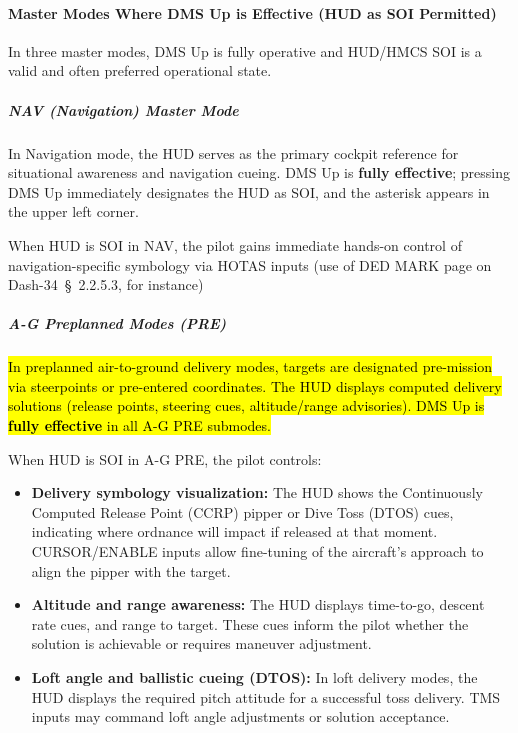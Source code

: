 \documentclass[11pt,a4paper]{article}
\providecommand{\dashref}[1]{Dash-34~\S~#1}
\begin{document}
\paragraph*{Master Modes Where DMS Up is Effective (HUD as SOI Permitted)}

In three master modes, DMS Up is fully operative and HUD/HMCS SOI is a valid and often preferred operational state.

\subparagraph*{NAV (Navigation) Master Mode}

In Navigation mode, the HUD serves as the primary cockpit reference for situational awareness and navigation cueing. DMS Up is \textbf{fully effective}; pressing DMS Up immediately designates the HUD as SOI, and the asterisk appears in the upper left corner.

When HUD is SOI in NAV, the pilot gains immediate hands-on control of navigation-specific symbology via HOTAS inputs (use of DED MARK page on \dashref{2.2.5.3}, for instance)

\subparagraph*{A-G Preplanned Modes (PRE)}

\hl{In preplanned air-to-ground delivery modes, targets are designated pre-mission via steerpoints or pre-entered coordinates. The HUD displays computed delivery solutions (release points, steering cues, altitude/range advisories). DMS Up is \textbf{fully effective} in all A-G PRE submodes.}

When HUD is SOI in A-G PRE, the pilot controls:

\begin{itemize}

\item \textbf{Delivery symbology visualization:} The HUD shows the Continuously Computed Release Point (CCRP) pipper or Dive Toss (DTOS) cues, indicating where ordnance will impact if released at that moment. CURSOR/ENABLE inputs allow fine-tuning of the aircraft's approach to align the pipper with the target.

\item \textbf{Altitude and range awareness:} The HUD displays time-to-go, descent rate cues, and range to target. These cues inform the pilot whether the solution is achievable or requires maneuver adjustment.

\item \textbf{Loft angle and ballistic cueing (DTOS):} In loft delivery modes, the HUD displays the required pitch attitude for a successful toss delivery. TMS inputs may command loft angle adjustments or solution acceptance.

\end{itemize}
\end{document}
